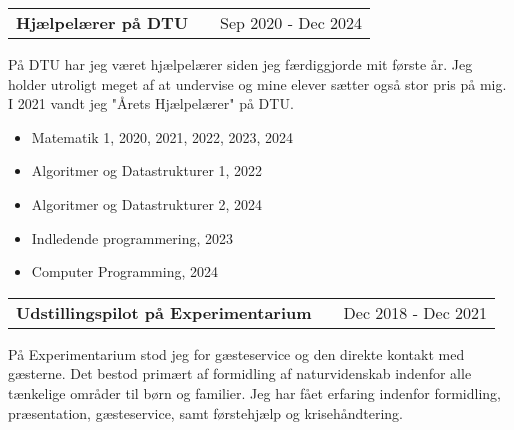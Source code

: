 \documentclass[a4paper,12pt]{article}
\makeatletter
\newenvironment{jobshort}[2]
    {
    \begin{tabularx}{\linewidth}{@{}l X r@{}}
    \textbf{#1} & \hfill &  #2 \\[3.75pt]
    \end{tabularx}
    }
    {
    }
\makeatother
\begin{document}
\begin{jobshort}{Hjælpelærer på DTU}{Sep 2020 - Dec 2024}
På DTU har jeg været hjælpelærer siden jeg færdiggjorde mit første år. Jeg holder utroligt meget af at undervise og mine elever sætter også stor pris på mig. I 2021 vandt jeg "Årets Hjælpelærer" på DTU. 
\begin{minipage}[t]{\linewidth}\vspace{-3pt}
\begin{itemize}[nosep,after=\strut, leftmargin=1em, itemsep=3pt,label=--]
    \item Matematik 1, 2020, 2021, 2022, 2023, 2024
    \item Algoritmer og Datastrukturer 1, 2022
    \item Algoritmer og Datastrukturer 2, 2024
    \item Indledende programmering, 2023
    \item Computer Programming, 2024
\end{itemize}
\end{minipage}
\end{jobshort}


\begin{jobshort}{Udstillingspilot på Experimentarium}{Dec 2018 - Dec 2021}
På Experimentarium stod jeg for gæsteservice og den direkte kontakt med gæsterne. Det bestod primært af formidling af naturvidenskab indenfor alle tænkelige områder til børn og familier. Jeg har fået erfaring indenfor formidling, præsentation, gæsteservice, samt førstehjælp og krisehåndtering. 
\end{jobshort}
  

\end{document}

